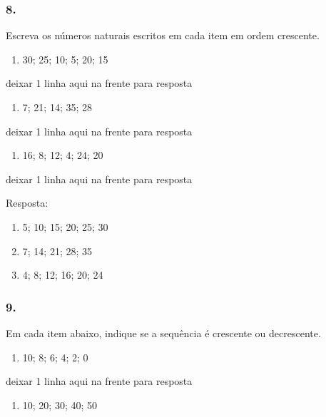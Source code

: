 \subsubsection{8.}\label{section-40}

Escreva os números naturais escritos em cada item em ordem crescente.

\begin{enumerate}
\def\labelenumi{\alph{enumi})}
\item
  30; 25; 10; 5; 20; 15
\end{enumerate}

deixar 1 linha aqui na frente para resposta

\begin{enumerate}
\def\labelenumi{\alph{enumi})}
\item
  7; 21; 14; 35; 28
\end{enumerate}

deixar 1 linha aqui na frente para resposta

\begin{enumerate}
\def\labelenumi{\alph{enumi})}
\item
  16; 8; 12; 4; 24; 20
\end{enumerate}

deixar 1 linha aqui na frente para resposta

Resposta:

\begin{enumerate}
\def\labelenumi{\alph{enumi})}
\item
  5; 10; 15; 20; 25; 30
\item
  7; 14; 21; 28; 35
\item
  4; 8; 12; 16; 20; 24
\end{enumerate}

\subsubsection{9.}\label{section-41}

Em cada item abaixo, indique se a sequência é crescente ou decrescente.

\begin{enumerate}
\def\labelenumi{\alph{enumi})}
\item
  10; 8; 6; 4; 2; 0
\end{enumerate}

deixar 1 linha aqui na frente para resposta

\begin{enumerate}
\def\labelenumi{\alph{enumi})}
\item
  10; 20; 30; 40; 50
\end{enumerate}


